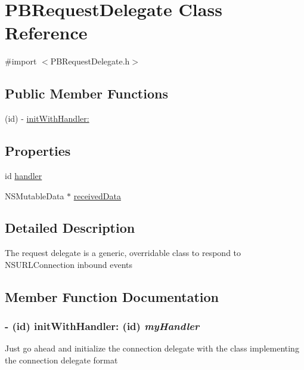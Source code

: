 \hypertarget{interface_p_b_request_delegate}{
\section{PBRequestDelegate Class Reference}
\label{interface_p_b_request_delegate}
}


{\ttfamily \#import $<$PBRequestDelegate.h$>$}

\subsection*{Public Member Functions}
\begin{DoxyCompactItemize}
\item 
(id) -\/ \hyperlink{interface_p_b_request_delegate_a7fef1b0584a2e49d581c938e0921e8e6}{initWithHandler:}
\end{DoxyCompactItemize}
\subsection*{Properties}
\begin{DoxyCompactItemize}
\item 
id \hyperlink{interface_p_b_request_delegate_a2e9c42e929a2260dbea48ac0d0136e7a}{handler}
\item 
NSMutableData $\ast$ \hyperlink{interface_p_b_request_delegate_af791281e7c89b398f47ca32063a1d2fa}{receivedData}
\end{DoxyCompactItemize}


\subsection{Detailed Description}
The request delegate is a generic, overridable class to respond to NSURLConnection inbound events 

\subsection{Member Function Documentation}
\hypertarget{interface_p_b_request_delegate_a7fef1b0584a2e49d581c938e0921e8e6}{
\subsubsection[{initWithHandler:}]{\setlength{\rightskip}{0pt plus 5cm}-\/ (id) initWithHandler: (id) {\em myHandler}}}
\label{interface_p_b_request_delegate_a7fef1b0584a2e49d581c938e0921e8e6}
Just go ahead and initialize the connection delegate with the class implementing the connection delegate format 

